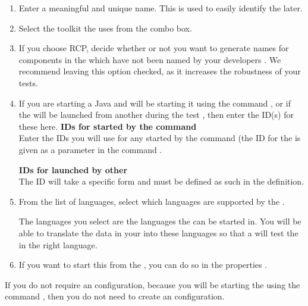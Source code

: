 \begin{enumerate}
\item Enter a meaningful and unique \gdaut{} name. This is used to easily identify the \gdaut{} later. 
\item Select the toolkit the \gdaut{} uses from the combo box. 
\item If you choose RCP, decide whether or not you want to generate names for components in the \gdaut{} which have not been named by your developers . We recommend leaving this option checked, as it increases the robustness of your tests. 
\item If you are starting a Java \gdaut{} and  will be starting it using the  command , or if the \gdaut{} will be launched from another \gdaut{} during the test , then enter the ID(s) for these \gdauts{} here. 
\textbf{IDs for \gdauts{} started by the  command}\\
Enter the \gdaut{} IDs you will use for any \gdauts{} started by the  command (the \gdaut{} ID for the \gdaut{} is given as a parameter in the  command .

\textbf{IDs for \gdauts{} launched by other \gdauts{}}\\
The \gdaut{} ID will take a specific form  and must be defined as such in the \gdaut{} definition.
 
\item From the list of \gdproject{} languages, select which languages are supported by the \gdaut{}. 

The languages you select are the languages the \gdaut{} can be started in.  You will be able to translate the data in your \gdcases{} into these languages so that a \gdsuite{} will test the \gdaut{} in the right language. 


\item If you want to start this \gdaut{} from the \ite{}, you can do so in the \gdproject{} properties .
\end{enumerate}

If you do not require an \gdaut{} configuration, because you will be starting the \gdaut{} using the  command , then you do not need to create an \gdaut{} configuration. 

\clearpage
